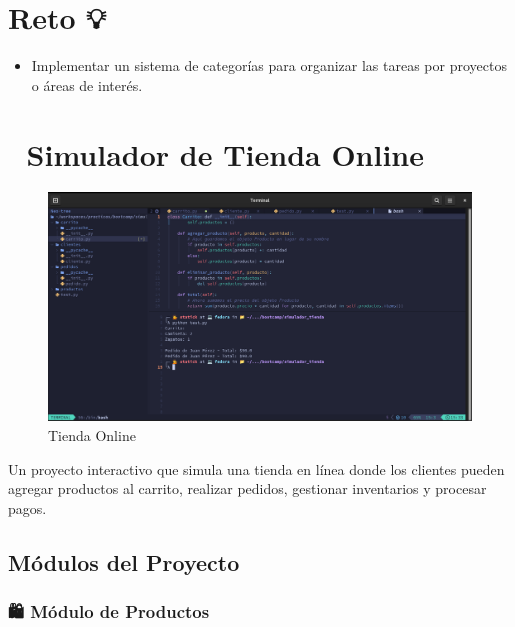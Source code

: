 \documentclass[
  a4paper,
  DIV=11,
  numbers=noendperiod,
  onepage,
  openany]{scrreprt}
\providecommand{\tightlist}{%
  \setlength{\itemsep}{0pt}\setlength{\parskip}{0pt}}\usepackage{longtable,booktabs,array}
\begin{document}
\chapter{Reto 💡}\label{reto}

\begin{itemize}
\tightlist
\item
  Implementar un sistema de categorías para organizar las tareas por
  proyectos o áreas de interés.
\end{itemize}

\chapter{🛒 Simulador de Tienda
Online}\label{simulador-de-tienda-online}

\begin{figure}[H]

{\centering \includegraphics{unidades/Proyectos/images/tienda_online.png}

}

\caption{Tienda Online}

\end{figure}%

Un proyecto interactivo que simula una tienda en línea donde los
clientes pueden agregar productos al carrito, realizar pedidos,
gestionar inventarios y procesar pagos.

\section{Módulos del Proyecto}\label{muxf3dulos-del-proyecto-1}

\subsection{🛍️ Módulo de Productos}\label{muxf3dulo-de-productos}
\end{document}
